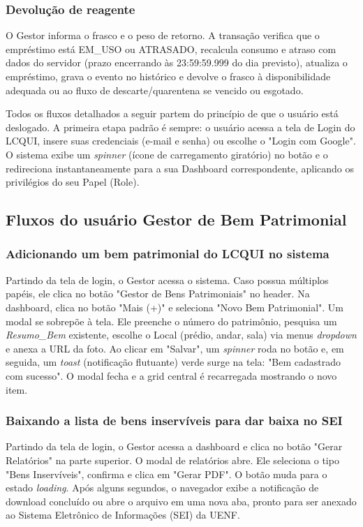 \documentclass[12pt,a4paper]{article}
\begin{document}
\subsubsection{Devolução de reagente}
O Gestor informa o frasco e o peso de retorno. A transação verifica que o empréstimo está EM\_USO ou ATRASADO, recalcula consumo e atraso com dados do servidor (prazo encerrando às 23:59:59.999 do dia previsto), atualiza o empréstimo, grava o evento no histórico e devolve o frasco à disponibilidade adequada ou ao fluxo de descarte/quarentena se vencido ou esgotado.

\begin{explicacao}
Todos os fluxos detalhados a seguir partem do princípio de que o usuário está deslogado. A primeira etapa padrão é sempre: o usuário acessa a tela de Login do LCQUI, insere suas credenciais (e-mail e senha) ou escolhe o "Login com Google". O sistema exibe um \textit{spinner} (ícone de carregamento giratório) no botão e o redireciona instantaneamente para a sua Dashboard correspondente, aplicando os privilégios do seu Papel (Role).
\end{explicacao}

\subsection{Fluxos do usuário Gestor de Bem Patrimonial}

\subsubsection{Adicionando um bem patrimonial do LCQUI no sistema}
Partindo da tela de login, o Gestor acessa o sistema. Caso possua múltiplos papéis, ele clica no botão "Gestor de Bens Patrimoniais" no header. Na dashboard, clica no botão "Mais (+)" e seleciona "Novo Bem Patrimonial". Um modal se sobrepõe à tela. Ele preenche o número do patrimônio, pesquisa um \textit{Resumo\_Bem} existente, escolhe o Local (prédio, andar, sala) via menus \textit{dropdown} e anexa a URL da foto. Ao clicar em "Salvar", um \textit{spinner} roda no botão e, em seguida, um \textit{toast} (notificação flutuante) verde surge na tela: "Bem cadastrado com sucesso". O modal fecha e a grid central é recarregada mostrando o novo item.

\subsubsection{Baixando a lista de bens inservíveis para dar baixa no SEI}
Partindo da tela de login, o Gestor acessa a dashboard e clica no botão "Gerar Relatórios" na parte superior. O modal de relatórios abre. Ele seleciona o tipo "Bens Inservíveis", confirma e clica em "Gerar PDF". O botão muda para o estado \textit{loading}. Após alguns segundos, o navegador exibe a notificação de download concluído ou abre o arquivo em uma nova aba, pronto para ser anexado ao Sistema Eletrônico de Informações (SEI) da UENF.
\end{document}
